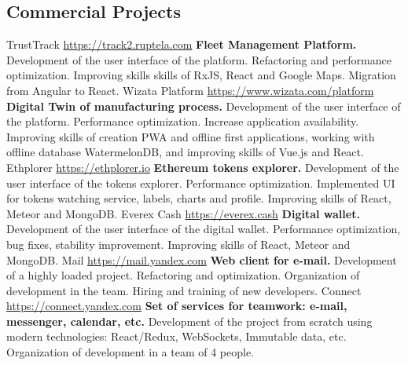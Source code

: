 \documentclass[11pt,a4paper]{moderncv}
\begin{document}
  \subsection{Commercial Projects}
  \cvline
    {TrustTrack}
    {\url{https://track2.ruptela.com}\newline{}
    \textbf{Fleet Management Platform.}\newline{}
    Development of the user interface of the platform. Refactoring and performance optimization.
    Improving skills skills of RxJS, React and Google Maps. Migration from Angular to React. }
  \cvline
    {Wizata Platform}
    {\url{https://www.wizata.com/platform}\newline{}
    \textbf{Digital Twin of manufacturing process.}\newline{}
    Development of the user interface of the platform. Performance optimization. Increase application availability.
    Improving skills of creation PWA and offline first applications, working with offline database WatermelonDB, and improving skills of Vue.js and React.}
  \cvline
    {Ethplorer}
    {\url{https://ethplorer.io}\newline{}
    \textbf{Ethereum tokens explorer.}\newline{}
    Development of the user interface of the tokens explorer. Performance optimization. Implemented UI for tokens watching service, labels, charts and profile.\newline{}
    Improving skills of React, Meteor and MongoDB.}
  \cvline
    {Everex Cash}
    {\url{https://everex.cash}\newline{}
    \textbf{Digital wallet.}\newline{}
    Development of the user interface of the digital wallet. Performance optimization, bug fixes, stability improvement.
    Improving skills of React, Meteor and MongoDB.}
  \cvline
    {Mail}
    {\url{https://mail.yandex.com}\newline{}
    \textbf{Web client for e-mail.}\newline{}
    Development of a highly loaded project. Refactoring and optimization.\newline{}
    Organization of development in the team. Hiring and training of new developers.}
  \cvline
    {Connect}
    {\url{https://connect.yandex.com}\newline{}
    \textbf{Set of services for teamwork: e-mail, messenger, calendar, etc.}\newline{}
    Development of the project from scratch using modern technologies:
    React/Redux, WebSockets, Immutable data, etc.
    Organization of development in a team of 4 people.}
\end{document}
